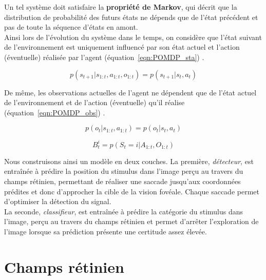 Un tel système doit satisfaire la \textbf{propriété de Markov}, qui décrit que la distribution de probabilité des futurs états ne dépends que de l'état précédent et pas de toute la séquence d'états en amont.\\
Ainsi lors de l'évolution du système dans le temps, on considère que l'état suivant de l'environnement est uniquement influencé par son état actuel et l'action (éventuelle) réalisée par l'agent (équation~\ref{eqn:POMDP_sta}) \autocite{Butko2010}. 

\begin{equation}
p(s_{t+1}|s_{1:t},a_{1:t},o_{1:t}) = p(s_{t+1}|s_{t},a_{t})
\label{eqn:POMDP_sta}
\end{equation}

De même, les observations actuelles de l'agent ne dépendent que de l'état actuel de l'environnement et de l'action (éventuelle) qu'il réalise (équation~\ref{eqn:POMDP_obs}) \autocite{Butko2010}.

\begin{equation}
p(o_{t}|s_{1:t},a_{1:t}) = p(o_{t}|s_{t},a_{t})
\label{eqn:POMDP_obs}
\end{equation}

\begin{equation}
B_{t}^i = p(S_{t} = i|A_{1:t},O_{1:t})
\label{eqn:POMDP_bel}
\end{equation}

Nous construisons ainsi un modèle en deux couches. La première, \textit{détecteur}, est entraînée à prédire la position du stimulus dans l'image perçu au travers du champs rétinien, permettant de réaliser une saccade jusqu'aux coordonnées prédites et donc d'approcher la cible de la vision fovéale. Chaque saccade permet d'optimiser la détection du signal.\autocite{Friston2012}\\
La seconde, \textit{classifieur}, est entraînée à prédire la catégorie du stimulus dans l'image, perçu au travers du champs rétinien et permet d'arrêter l'exploration de l'image lorsque sa prédiction présente une certitude assez élevée.


\section{Champs rétinien} %

